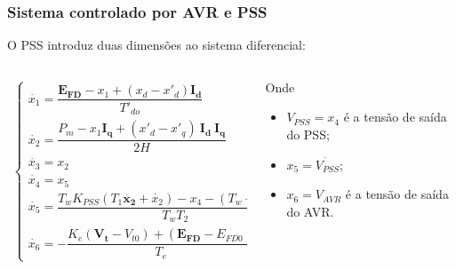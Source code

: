 \documentclass[10pt, compress,xcolor={svgnames,dvipsnames,x11names}]{beamer}
\begin{document}
\begin{frame}%
\frametitle{Sistema controlado por AVR e PSS}
\scriptsize

	O PSS introduz duas dimensões ao sistema diferencial:
\begin{columns}[T]
\begin{column}{0.5\textwidth}
\begin{align}
\left\{ \begin{array}{l}
\dot{x_1} = \dfrac{\mathbf{E_{FD}} - x_1 + (x_d - x'_d)\mathbf{I_d}}{T'_{do}} \\[5mm]
%
\dot{x_2} = \dfrac{P_m - x_1 \mathbf{I_q} + (x'_d - x'_q)\ \mathbf{I_d\ I_q}}{2H} \\[5mm]
%
\dot{x_3} = x_2 \\[5mm]
%
\dot{x_4} = x_5 \\[5mm]
%
\dot{x_5} = \dfrac{T_wK_{PSS} \left( T_1 \ddot{\mathbf{x_2}} + \dot{x_2} \right) - x_4 - (T_w + T_2)x_5}{T_wT_2} \\[5mm]
%
\dot{x_6} = - \dfrac{ K_e(\mathbf{V_t} - V_{t0}) + \left( \mathbf{E_{FD}} - E_{FD0} \right) }{T_e}
\end{array}\right. \label{sis::sistemaDiferencialAVRPSSSemSaturação}
\end{align}
\end{column}
\begin{column}{0.5\textwidth}
\vspace{2cm}
	Onde

\begin{itemize}
	\item $V_{PSS} = x_4$ é a tensão de saída do PSS;
	\item $x_5 = \dot{V_{PSS}}$;
	\item $x_6 = V_{AVR}$ é a tensão de saída do AVR. 
\end{itemize}
\end{column}
\end{columns}

\normalsize
\end{frame}%
\end{document}
